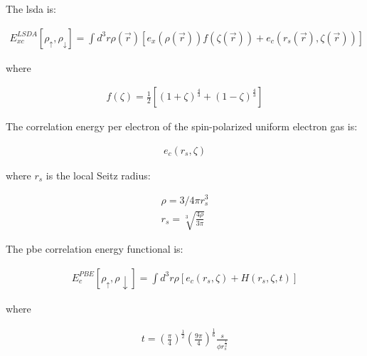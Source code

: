 The \acrshort{lsda} is:

\begin{equation}
\begin{split}
E_{xc}^{LSDA} [\rho_{\uparrow}, \rho_{\downarrow}] = \int d^3r \rho(\vec{r}) \left[e_x(\rho(\vec{r})) f(\zeta(\vec{r})) + e_c(r_s(\vec{r}), \zeta(\vec{r})) \right ]
\end{split}
\label{eq:functional6}
\end{equation}

where

\begin{equation}
\begin{split}
f(\zeta) = \frac{1}{2} \left[(1 + \zeta)^{\frac{4}{3}} + (1 - \zeta)^{\frac{4}{3}} \right]
\end{split}
\label{eq:functional7}
\end{equation}

The correlation energy per electron of the spin-polarized uniform electron gas is:

\begin{equation}
\begin{split}
e_c (r_s, \zeta)
\end{split}
\label{eq:functional8}
\end{equation}

where $r_s$ is the local Seitz radius:

\begin{equation}
\begin{split}
\rho = 3/4 \pi r_s^3 \\
r_s = \sqrt[3]{\frac{4 \rho}{3 \pi}}
\end{split}
\label{eq:functional9}
\end{equation}

The \acrshort{pbe} correlation energy functional is:

\begin{equation}
\begin{split}
E_{c}^{PBE} [\rho_{\uparrow}, \rho{\downarrow}] = \int d^3r \rho[e_c (r_s, \zeta) + H(r_s, \zeta, t)] 
\end{split}
\label{eq:functional9}
\end{equation}

where

\begin{equation}
\begin{split}
t = \left(\frac{\pi}{4}\right)^{\frac{1}{2}} \left(\frac{9 \pi}{4}\right)^{\frac{1}{6}} \frac{s}{\phi r_s^{\frac{1}{2}}}
\end{split}
\label{eq:functional9}
\end{equation}

